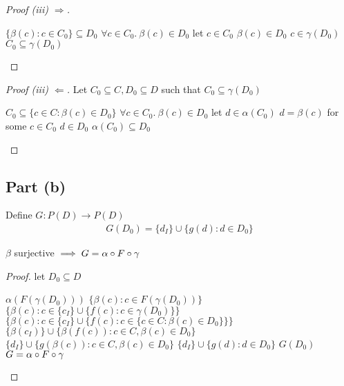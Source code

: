 \begin{prop}
\begin{proof}[Proof (iii) $\Rightarrow$]
    \begin{itemize}
      \step[\imps] $\{\beta(c) : c\in C_0\}\subseteq D_0$
      \step[\imps] $\forall c\in C_0.~\beta(c)\in D_0$
      \marginnote{($\star$)}
      \step let $c\in C_0$
      \step[\imps] $\beta(c)\in D_0$
      \step[\imps] $c\in\gamma(D_0)$
      \step[\imps]$C_0\subseteq\gamma(D_0)$\qedhere
    \end{itemize}
  \end{proof}
  \begin{proof}[Proof (iii) $\Leftarrow$]
    Let $C_0\subseteq C, D_0\subseteq D$ such that $C_0\subseteq\gamma(D_0)$
    \begin{itemize}
      \step[\imps] $C_0\subseteq\{c\in C : \beta(c)\in D_0\}$
      \step[\imps] $\forall c\in C_0.~\beta(c)\in D_0$
      \marginnote{($\star$)}
      \step let $d\in \alpha(C_0)$
      \step[\imps] $d = \beta(c)$ for some $c\in C_0$
      \step[\imps] $d\in D_0$
      \step[\imps]$\alpha(C_0)\subseteq D_0$\qedhere
    \end{itemize}
  \end{proof}
\end{prop}

\subsection{Part (b)}\label{sec:q-2-b}
Define $G : P(D)\to P(D)$
\begin{align*}
  G(D_0) = \{d_I\}\cup\{g(d) : d\in D_0\}
\end{align*}
\begin{prop}
  $\beta$ surjective $\implies G = \alpha\circ F\circ\gamma$
  \begin{proof}
    let $D_0\subseteq D$
    \begin{itemize}
      \step $\alpha(F(\gamma(D_0)))$
      \step[=] $\{\beta(c):c\in F(\gamma(D_0))\}$
      \step[=] $\{\beta(c):c\in \{c_I\}\cup\{f(c):c\in\gamma(D_0)\}\}$
      \step[=] $\{\beta(c):c\in \{c_I\}\cup\{f(c):c\in\{c\in C:\beta(c)\in D_0\}\}\}$
      \step[=] $\{\beta(c_I)\}\cup\{\beta(f(c)) : c\in C,\beta(c)\in D_0\}$
      \step[=] $\{d_I\}\cup\{g(\beta(c)) : c\in C,\beta(c)\in D_0\}$
      \step[=] $\{d_I\}\cup\{g(d):d\in D_0\}$
      \step[=] $G(D_0)$
      \step[\imps] $G = \alpha\circ F\circ\gamma$\qedhere
    \end{itemize}
  \end{proof}
\end{prop}

